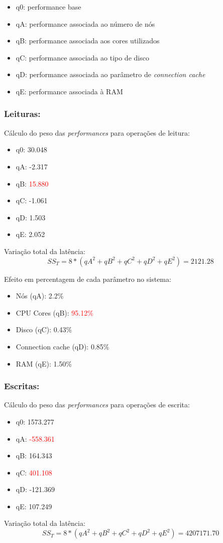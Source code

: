 \begin{itemize}
    \item q0: performance base
    \item qA: performance associada ao número de nós
    \item qB: performance associada aos cores utilizados
    \item qC: performance associada ao tipo de disco
    \item qD: performance associada ao parâmetro de \textit{connection cache}
    \item qE: performance associada à RAM
\end{itemize}

\subsubsection{Leituras:}
\noindent Cálculo do peso das \textit{performances} para operações de leitura:
\begin{itemize}
    \item q0: 30.048
    \item qA: -2.317
    \item qB: \textcolor{red}{15.880}
    \item qC: -1.061
    \item qD: 1.503
    \item qE: 2.052
\end{itemize}
Variação total da latência: 
\begin{equation}
    SS_{T}= 8*(qA^2+qB^2+qC^2+qD^2+qE^2)=2121.28
\end{equation}

Efeito em percentagem de cada parâmetro no sistema:
\begin{itemize}
    \item Nós (qA): 2.2\%
    \item CPU Cores (qB): \textcolor{red}{95.12\%}
    \item Disco (qC): 0.43\%
    \item Connection cache (qD): 0.85\%
    \item RAM (qE): 1.50\%
\end{itemize}

\subsubsection{Escritas:}
Cálculo do peso das \textit{performances} para operações de escrita:
\begin{itemize}
    \item q0: 1573.277
    \item qA: \textcolor{red}{-558.361}
    \item qB: 164.343
    \item qC: \textcolor{red}{401.108}
    \item qD: -121.369
    \item qE: 107.249
\end{itemize}
Variação total da latência: 
\begin{equation}
    SS_{T}= 8*(qA^2+qB^2+qC^2+qD^2+qE^2)=4207171.70
\end{equation}

